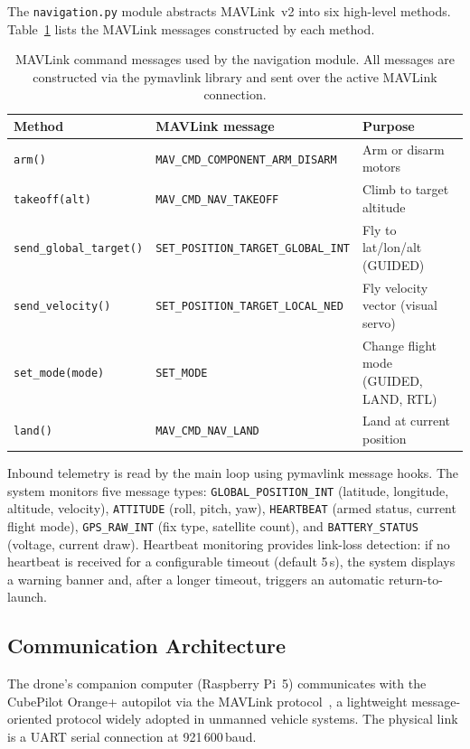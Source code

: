 The \texttt{navigation.py} module abstracts MAVLink~v2 \cite{mavlink2} into six high-level methods. Table~\ref{tab:mavlink-commands} lists the MAVLink messages constructed by each method.

\begin{table}[H]
\centering
\small
\begin{tabular}{lll}
\toprule
\textbf{Method} & \textbf{MAVLink message} & \textbf{Purpose} \\
\midrule
\texttt{arm()} & \texttt{MAV\_CMD\_COMPONENT\_ARM\_DISARM} & Arm or disarm motors \\
\texttt{takeoff(alt)} & \texttt{MAV\_CMD\_NAV\_TAKEOFF} & Climb to target altitude \\
\texttt{send\_global\_target()} & \texttt{SET\_POSITION\_TARGET\_GLOBAL\_INT} & Fly to lat/lon/alt (GUIDED) \\
\texttt{send\_velocity()} & \texttt{SET\_POSITION\_TARGET\_LOCAL\_NED} & Fly velocity vector (visual servo) \\
\texttt{set\_mode(mode)} & \texttt{SET\_MODE} & Change flight mode (GUIDED, LAND, RTL) \\
\texttt{land()} & \texttt{MAV\_CMD\_NAV\_LAND} & Land at current position \\
\bottomrule
\end{tabular}
\caption{MAVLink command messages used by the navigation module. All messages are constructed via the pymavlink library and sent over the active MAVLink connection.}
\label{tab:mavlink-commands}
\end{table}

Inbound telemetry is read by the main loop using pymavlink message hooks. The system monitors five message types: \texttt{GLOBAL\_POSITION\_INT} (latitude, longitude, altitude, velocity), \texttt{ATTITUDE} (roll, pitch, yaw), \texttt{HEARTBEAT} (armed status, current flight mode), \texttt{GPS\_RAW\_INT} (fix type, satellite count), and \texttt{BATTERY\_STATUS} (voltage, current draw). Heartbeat monitoring provides link-loss detection: if no heartbeat is received for a configurable timeout (default 5\,s), the system displays a warning banner and, after a longer timeout, triggers an automatic return-to-launch.

\subsection{Communication Architecture}\label{sec:arch-comms}

The drone's companion computer (Raspberry Pi~5) communicates with the CubePilot Orange+ autopilot via the MAVLink protocol~\cite{mavlink2}, a lightweight message-oriented protocol widely adopted in unmanned vehicle systems. The physical link is a UART serial connection at 921\,600\,baud.

